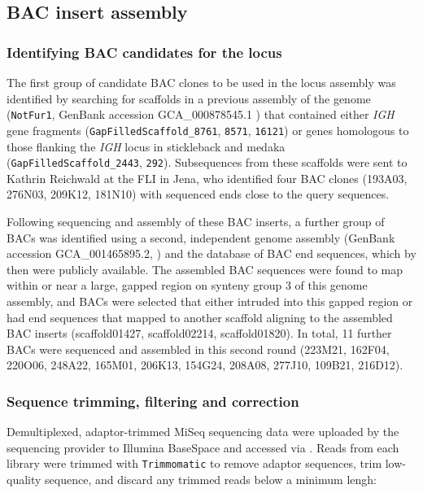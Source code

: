 \subsection{BAC insert assembly}
\label{sec:methods_comp_bacs}

\subsubsection{Identifying BAC candidates for the \nfu \igh{} locus}
\label{sec:methods_comp_bacs_ident}

The first group of candidate BAC clones to be used in the \Nfu locus assembly was identified by searching for scaffolds in a previous assembly of the \Nfu genome (\texttt{NotFur1}, GenBank accession GCA\_000878545.1 \parencite{valenzano2015genome}) that contained either \textit{IGH} gene fragments (\texttt{GapFilledScaffold\_8761}, \texttt{8571}, \texttt{16121}) or genes homologous to those flanking the \textit{IGH} locus in stickleback and medaka (\texttt{GapFilledScaffold\_2443}, \texttt{292}). Subsequences from these scaffolds were sent to Kathrin Reichwald at the FLI in Jena, who identified four BAC clones (193A03, 276N03, 209K12, 181N10) with sequenced ends close to the query sequences.

Following sequencing and assembly of these BAC inserts, a further group of BACs was identified using a second, independent genome assembly (GenBank accession 	GCA\_001465895.2, \parencite{reichwald2015genome}) and the database of BAC end sequences, which by then were publicly available. The assembled BAC sequences were found to map within or near a large, gapped region on synteny group 3 of this genome assembly, and BACs were selected that either intruded into this gapped region or had end sequences that mapped to another scaffold aligning to the assembled BAC inserts (scaffold01427, scaffold02214, scaffold01820). In total, 11 further BACs were sequenced and assembled in this second round (223M21, 162F04, 220O06, 248A22, 165M01, 206K13, 154G24, 208A08, 277J10, 109B21, 216D12).

\subsubsection{Sequence trimming, filtering and correction}
\label{sec:methods_comp_bacs_trim}

Demultiplexed, adaptor-trimmed MiSeq sequencing data were uploaded by the sequencing provider to Illumina BaseSpace and accessed via . Reads from each library were trimmed with \lstinline{Trimmomatic} \parencite{bolger2014trimmomatic} to remove adaptor sequences, trim low-quality sequence, and discard any trimmed reads below a minimum lengh:


